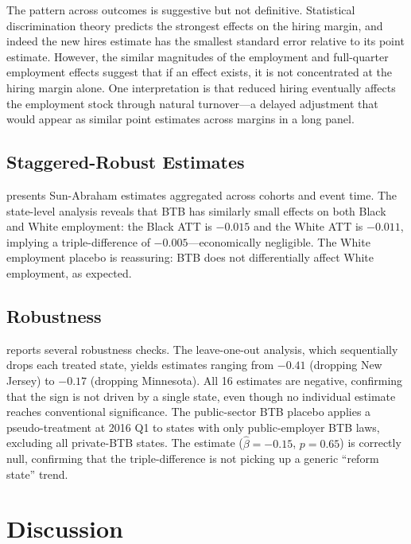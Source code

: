 \documentclass[12pt]{article}
\begin{document}
The pattern across outcomes is suggestive but not definitive. Statistical discrimination theory predicts the strongest effects on the hiring margin, and indeed the new hires estimate has the smallest standard error relative to its point estimate. However, the similar magnitudes of the employment and full-quarter employment effects suggest that if an effect exists, it is not concentrated at the hiring margin alone. One interpretation is that reduced hiring eventually affects the employment stock through natural turnover---a delayed adjustment that would appear as similar point estimates across margins in a long panel.

\subsection{Staggered-Robust Estimates}



 presents Sun-Abraham estimates aggregated across cohorts and event time. The state-level analysis reveals that BTB has similarly small effects on both Black and White employment: the Black ATT is $-0.015$ and the White ATT is $-0.011$, implying a triple-difference of $-0.005$---economically negligible. The White employment placebo is reassuring: BTB does not differentially affect White employment, as expected.

\subsection{Robustness}



 reports several robustness checks. The leave-one-out analysis, which sequentially drops each treated state, yields estimates ranging from $-0.41$ (dropping New Jersey) to $-0.17$ (dropping Minnesota). All 16 estimates are negative, confirming that the sign is not driven by a single state, even though no individual estimate reaches conventional significance. The public-sector BTB placebo applies a pseudo-treatment at 2016 Q1 to states with only public-employer BTB laws, excluding all private-BTB states. The estimate ($\hat{\beta} = -0.15$, $p = 0.65$) is correctly null, confirming that the triple-difference is not picking up a generic ``reform state'' trend.


\section{Discussion}
\end{document}
